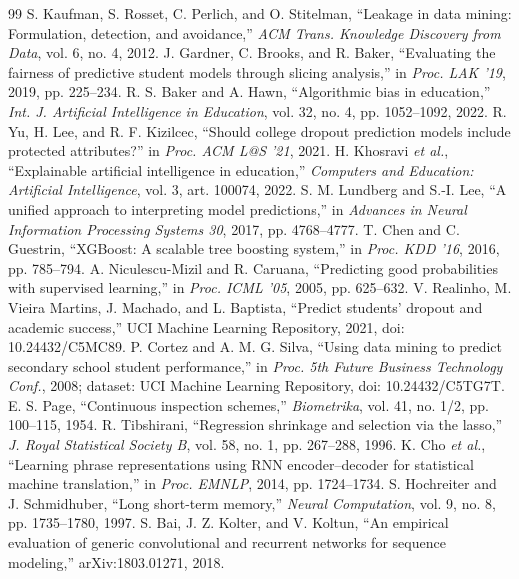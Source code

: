 \documentclass[conference]{IEEEtran}
\begin{document}
\begin{thebibliography}{99}
 S. Kaufman, S. Rosset, C. Perlich, and O. Stitelman, ``Leakage in data mining: Formulation,
detection, and avoidance,'' \emph{ACM Trans. Knowledge Discovery from Data}, vol. 6, no. 4, 2012.
 J. Gardner, C. Brooks, and R. Baker, ``Evaluating the fairness of predictive student models
through slicing analysis,'' in \emph{Proc. LAK '19}, 2019, pp. 225--234.
 R. S. Baker and A. Hawn, ``Algorithmic bias in education,'' \emph{Int. J. Artificial
Intelligence in Education}, vol. 32, no. 4, pp. 1052--1092, 2022.
 R. Yu, H. Lee, and R. F. Kizilcec, ``Should college dropout prediction models include protected
attributes?'' in \emph{Proc. ACM L@S '21}, 2021.
 H. Khosravi \emph{et al.}, ``Explainable artificial intelligence in education,''
\emph{Computers and Education: Artificial Intelligence}, vol. 3, art. 100074, 2022.
 S. M. Lundberg and S.-I. Lee, ``A unified approach to interpreting model predictions,'' in
\emph{Advances in Neural Information Processing Systems 30}, 2017, pp. 4768--4777.
 T. Chen and C. Guestrin, ``XGBoost: A scalable tree boosting system,'' in \emph{Proc. KDD '16},
2016, pp. 785--794.
 A. Niculescu-Mizil and R. Caruana, ``Predicting good probabilities with supervised
learning,'' in \emph{Proc. ICML '05}, 2005, pp. 625--632.
 V. Realinho, M. Vieira Martins, J. Machado, and L. Baptista, ``Predict students' dropout and
academic success,'' UCI Machine Learning Repository, 2021, doi: 10.24432/C5MC89.
 P. Cortez and A. M. G. Silva, ``Using data mining to predict secondary school student
performance,'' in \emph{Proc. 5th Future Business Technology Conf.}, 2008; dataset: UCI Machine Learning
Repository, doi: 10.24432/C5TG7T.
 E. S. Page, ``Continuous inspection schemes,'' \emph{Biometrika}, vol. 41, no. 1/2,
pp. 100--115, 1954.
 R. Tibshirani, ``Regression shrinkage and selection via the lasso,'' \emph{J. Royal
Statistical Society B}, vol. 58, no. 1, pp. 267--288, 1996.
 K. Cho \emph{et al.}, ``Learning phrase representations using RNN encoder--decoder for
statistical machine translation,'' in \emph{Proc. EMNLP}, 2014, pp. 1724--1734.
 S. Hochreiter and J. Schmidhuber, ``Long short-term memory,'' \emph{Neural Computation},
vol. 9, no. 8, pp. 1735--1780, 1997.
 S. Bai, J. Z. Kolter, and V. Koltun, ``An empirical evaluation of generic convolutional and
recurrent networks for sequence modeling,'' arXiv:1803.01271, 2018.

\end{thebibliography}
\end{document}
